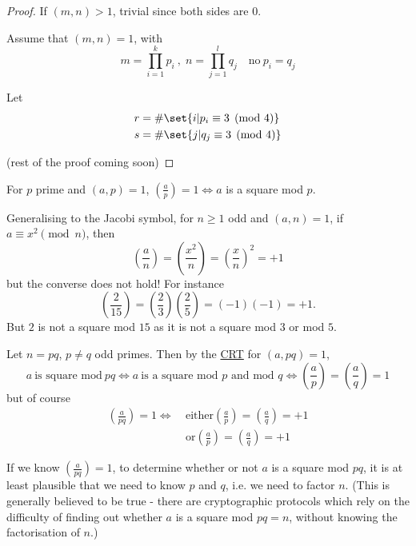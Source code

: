 \documentclass{article}
\newcommand{\legendre}[2]{\genfrac{(}{)}{}{}{#1}{#2}}
\begin{document}
\begin{proof}
    If $(m, n) > 1$, trivial since both sides are 0.

    Assume that $(m, n) = 1$, with
    \begin{equation*}
        m = \prod_{i=1}^k p_i \ , \; n = \prod_{j=1}^l q_j \quad \text{no} \ p_i = q_j
    \end{equation*}

    Let
    \begin{align*}
        r &= \# \set{i | p_i \equiv 3 \pmod{4}} \\
        s &= \# \set{j | q_j \equiv 3 \pmod{4}}
    \end{align*}

    (rest of the proof coming soon)
\end{proof}

For $p$ prime and $(a, p) = 1$, $\legendre{a}{p} = 1 \iff a$ is a square mod $p$.

Generalising to the Jacobi symbol, for $n \geq 1$ odd and $(a, n) = 1$, if $a \equiv x^2 \pmod{n}$, then
\begin{equation*}
    \legendre{a}{n} = \legendre{x^2}{n} = \legendre{x}{n}^2 = +1
\end{equation*}
but the converse does not hold! For instance
\begin{equation*}
    \legendre{2}{15} = \legendre{2}{3} \legendre{2}{5} = (-1) (-1) = +1.
\end{equation*}
But $2$ is not a square mod $15$ as it is not a square mod $3$ or mod $5$.

Let $n = pq$, $p \neq q$ odd primes. Then by the \hyperlink{thm:crt}{CRT} for $(a, pq) = 1$,
\begin{equation*}
    a \ \text{is square mod} \ pq \iff a \ \text{is a square mod $p$ and mod $q$} \iff \legendre{a}{p} = \legendre{a}{q} = 1
\end{equation*}
but of course
\begin{align*}
    \legendre{a}{pq} = 1 \iff \ &\text{either} \legendre{a}{p} = \legendre{a}{q} = +1 \\
    & \text{or} \legendre{a}{p} = \legendre{a}{q} = +1
\end{align*}

If we know $\legendre{a}{pq} = 1$, to determine whether or not $a$ is a square mod $pq$, it is at least plausible that we need to know $p$ and $q$, i.e. we need to factor $n$.
(This is generally believed to be true - there are cryptographic protocols which rely on the difficulty of finding out whether $a$ is a square mod $pq=n$, without knowing the factorisation of $n$.)
\end{document}
